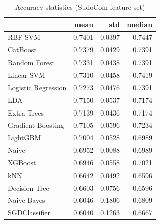 \begin{table}
\caption{Accuracy statistics (SudoCom feature set)}
\label{tab:accuracy_SudoCom_stats}
\begin{tabular}{lrrr}
\toprule
 & mean & std & median \\
\midrule
RBF SVM & 0.7401 & 0.0397 & 0.7447 \\
CatBoost & 0.7379 & 0.0429 & 0.7391 \\
Random Forest & 0.7331 & 0.0438 & 0.7391 \\
Linear SVM & 0.7310 & 0.0458 & 0.7419 \\
Logistic Regression & 0.7273 & 0.0476 & 0.7391 \\
LDA & 0.7150 & 0.0537 & 0.7174 \\
Extra Trees & 0.7139 & 0.0436 & 0.7174 \\
Gradient Boosting & 0.7105 & 0.0596 & 0.7234 \\
LightGBM & 0.7004 & 0.0528 & 0.6989 \\
Naive & 0.6952 & 0.0088 & 0.6989 \\
XGBoost & 0.6946 & 0.0558 & 0.7021 \\
kNN & 0.6642 & 0.0492 & 0.6596 \\
Decision Tree & 0.6603 & 0.0756 & 0.6596 \\
Naive Bayes & 0.6046 & 0.1806 & 0.6809 \\
SGDClassifier & 0.6040 & 0.1263 & 0.6667 \\
\bottomrule
\end{tabular}
\end{table}
